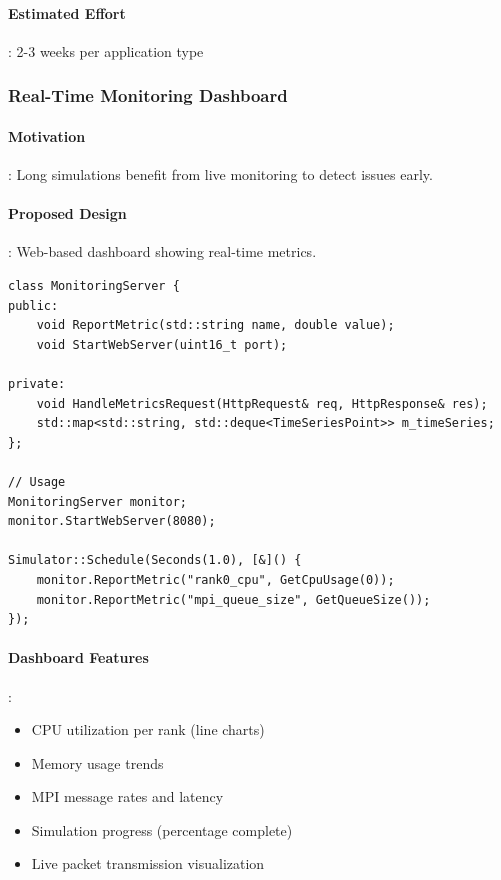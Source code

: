 \paragraph{Estimated Effort}: 2-3 weeks per application type

\subsubsection{Real-Time Monitoring Dashboard}

\paragraph{Motivation}:
Long simulations benefit from live monitoring to detect issues early.

\paragraph{Proposed Design}:
Web-based dashboard showing real-time metrics.

\begin{lstlisting}[style=cpp]
class MonitoringServer {
public:
    void ReportMetric(std::string name, double value);
    void StartWebServer(uint16_t port);
    
private:
    void HandleMetricsRequest(HttpRequest& req, HttpResponse& res);
    std::map<std::string, std::deque<TimeSeriesPoint>> m_timeSeries;
};

// Usage
MonitoringServer monitor;
monitor.StartWebServer(8080);

Simulator::Schedule(Seconds(1.0), [&]() {
    monitor.ReportMetric("rank0_cpu", GetCpuUsage(0));
    monitor.ReportMetric("mpi_queue_size", GetQueueSize());
});
\end{lstlisting}

\paragraph{Dashboard Features}:
\begin{itemize}
    \item CPU utilization per rank (line charts)
    \item Memory usage trends
    \item MPI message rates and latency
    \item Simulation progress (percentage complete)
    \item Live packet transmission visualization
\end{itemize}

